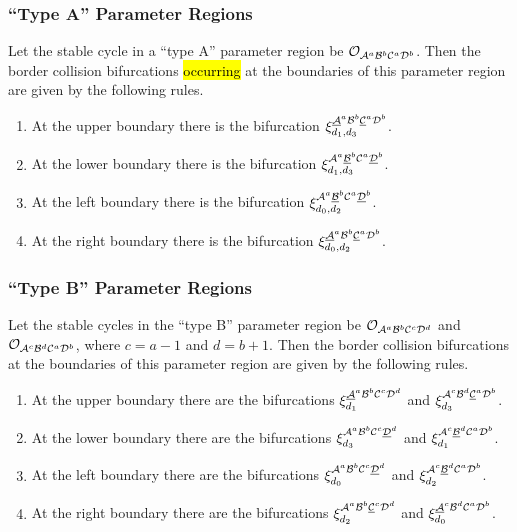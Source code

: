 \subsubsection{``Type A'' Parameter Regions}

Let the stable cycle in a ``type A'' parameter region be $\mathcal{O}_{\mathcal{A}^a\mathcal{B}^b\mathcal{C}^a\mathcal{D}^b}$.
Then the border collision bifurcations \hl{occurring} at the boundaries of this parameter region are given by the following rules.

\begin{enumerate}
	\item At the upper boundary there is the bifurcation $\xi_{d_1, d_3}^{\underline{\mathcal{A}}^a\mathcal{B}^b\underline{\mathcal{C}}^a\mathcal{D}^b}$.
	\item At the lower boundary there is the bifurcation $\xi_{d_1, d_3}^{\mathcal{A}^a\underline{\mathcal{B}}^b\mathcal{C}^a\underline{\mathcal{D}}^b}$.
	\item At the left boundary there is the bifurcation $\xi_{d_0, d_2}^{\mathcal{A}^a\underline{\mathcal{B}}^b\mathcal{C}^a\underline{\mathcal{D}}^b}$.
	\item At the right boundary there is the bifurcation $\xi_{d_0, d_2}^{\underline{\mathcal{A}}^a\mathcal{B}^b\underline{\mathcal{C}}^a\mathcal{D}^b}$.
\end{enumerate}

\subsubsection{``Type B'' Parameter Regions}

Let the stable cycles in the ``type B'' parameter region be $\mathcal{O}_{\mathcal{A}^a\mathcal{B}^b\mathcal{C}^c\mathcal{D}^d}$ and $\mathcal{O}_{\mathcal{A}^c\mathcal{B}^d\mathcal{C}^a\mathcal{D}^b}$, where $c = a - 1$ and $d = b + 1$.
Then the border collision bifurcations at the boundaries of this parameter region are given by the following rules.

\begin{enumerate}
	\item At the upper boundary there are the bifurcations $\xi_{d_1}^{\underline{\mathcal{A}}^a\mathcal{B}^b\mathcal{C}^c\mathcal{D}^d}$ and $\xi_{d_3}^{\mathcal{A}^c\mathcal{B}^d\underline{\mathcal{C}}^a\mathcal{D}^b}$.
	\item At the lower boundary there are the bifurcations $\xi_{d_3}^{\mathcal{A}^a\mathcal{B}^b\mathcal{C}^c\underline{\mathcal{D}}^d}$ and $\xi_{d_1}^{\mathcal{A}^c\underline{\mathcal{B}}^d\mathcal{C}^a\mathcal{D}^b}$.
	\item At the left boundary there are the bifurcations $\xi_{d_0}^{\mathcal{A}^a\mathcal{B}^b\mathcal{C}^c\underline{\mathcal{D}}^d}$ and $\xi_{d_2}^{\mathcal{A}^c\underline{\mathcal{B}}^d\mathcal{C}^a\mathcal{D}^b}$.
	\item At the right boundary there are the bifurcations $\xi_{d_2}^{\mathcal{A}^a\mathcal{B}^b\underline{\mathcal{C}}^c\mathcal{D}^d}$ and $\xi_{d_0}^{\underline{\mathcal{A}}^c\mathcal{B}^d\mathcal{C}^a\mathcal{D}^b}$.
\end{enumerate}

